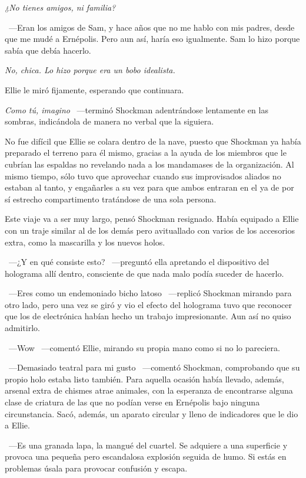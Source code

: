 \emph{¿No tienes amigos, ni familia?}

~---Eran los amigos de Sam, y hace años que no me hablo con mis padres, desde que me mudé a Ernépolis. Pero aun así, haría eso igualmente. Sam lo hizo porque sabía que debía hacerlo.

\emph{No, chica. Lo hizo porque era un bobo idealista.}

Ellie le miró fijamente, esperando que continuara.

\emph{Como tú, imagino} ~---terminó Shockman adentrándose lentamente en las sombras, indicándola de manera no verbal que la siguiera.

No fue difícil que Ellie se colara dentro de la nave, puesto que Shockman ya había preparado el terreno para él mismo, gracias a la ayuda de los miembros que le cubrían las espaldas no revelando nada a los mandamases de la organización. Al mismo tiempo, sólo tuvo que aprovechar cuando sus improvisados aliados no estaban al tanto, y engañarles a su vez para que ambos entraran en el ya de por sí estrecho compartimento tratándose de una sola persona.

Este viaje va a ser muy largo, pensó Shockman resignado. Había equipado a Ellie con un traje similar al de los demás pero avituallado con varios de los accesorios extra, como la mascarilla y los nuevos holos.

~---¿Y en qué consiste esto? ~---preguntó ella apretando el dispositivo del holograma allí dentro, consciente de que nada malo podía suceder de hacerlo.

~---Eres como un endemoniado bicho latoso ~---replicó Shockman mirando para otro lado, pero una vez se giró y vio el efecto del holograma tuvo que reconocer que los de electrónica habían hecho un trabajo impresionante. Aun así no quiso admitirlo.

~---Wow ~---comentó Ellie, mirando su propia mano como si no lo pareciera.

~---Demasiado teatral para mi gusto ~---comentó Shockman, comprobando que su propio holo estaba listo también. Para aquella ocasión había llevado, además, arsenal extra de chismes atrae animales, con la esperanza de encontrarse alguna clase de criatura de las que no podían verse en Ernépolis bajo ninguna circunstancia. Sacó, además, un aparato circular y lleno de indicadores que le dio a Ellie.

~---Es una granada lapa, la mangué del cuartel. Se adquiere a una superficie y provoca una pequeña pero escandalosa explosión seguida de humo. Si estás en problemas úsala para provocar confusión y escapa.

